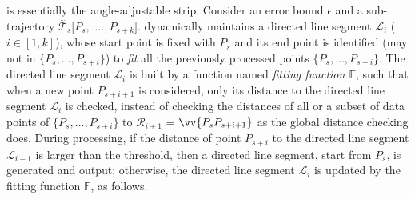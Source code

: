 \operb\cite{Lin:Operb} is essentially the angle-adjustable strip\cite{Reumann:Strip}.
Consider an error bound $\epsilon$ and a sub-trajectory $\dddot{\mathcal{T}_s}[P_s,$ $\ldots, P_{s+k}]$.
\operb dynamically maintains a directed line segment $\mathcal{L}_i$ ($i\in[1,k]$), whose start point is fixed with $P_s$ and its end point is identified (may not in $\{P_s, \ldots, P_{s+i}\}$) to {\em fit} all the previously processed points $\{P_s, \ldots, P_{s+i}\}$.
The directed line segment $\mathcal{L}_i$ is built by a function named \emph{fitting function $\mathbb{F}$}, such that when a new point $P_{s+i+1}$ is considered, only its distance to the directed line segment $\mathcal{L}_i$ is checked, instead of checking the distances of all or a subset of data points of $\{P_{s}, \ldots, P_{s+i}\}$ to $\mathcal{R}_{i+1}$ = $\vv{P_sP_{s+i+1}}$ as the global distance checking does.
During processing, if the distance of point $P_{s+i}$ to the directed line segment $\mathcal{L}_{i-1}$ is larger than the threshold, then a directed line segment, start from $P_s$, is generated and output;
otherwise, the directed line segment $\mathcal{L}_i$ is updated by the fitting function $\mathbb{F}$, as follows.

